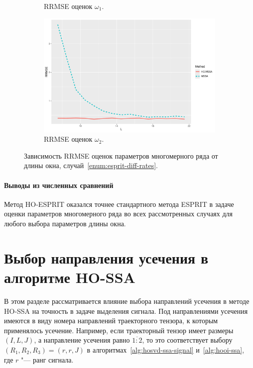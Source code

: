 \documentclass[specialist,
  substylefile=spbu_report.rtx,
subf,href,colorlinks=true, 12pt]{disser}
\theoremstyle{plain}
\theoremstyle{definition}
\theoremstyle{remark}
\begin{document}
\begin{figure}[!ht]
\begin{subfigure}{0.49\linewidth}
    \caption{RRMSE оценок $\omega_1$.}
    \label{fig:freq1_L}
  \end{subfigure}
  \begin{subfigure}{0.49\linewidth}
    \includegraphics[width=\linewidth, height=0.167\textheight]{freq2_L.pdf}
    \caption{RRMSE оценок $\omega_2$.}
    \label{fig:freq2_L}
  \end{subfigure}
  \caption{Зависимость RRMSE оценок параметров многомерного ряда от длины окна,
  случай~\ref{enum:esprit-diff-rates}.}
  \label{fig:L_diff_rates}
\end{figure}

\paragraph{Выводы из численных сравнений}
Метод HO-ESPRIT оказался точнее стандартного метода ESPRIT в задаче оценки параметров
многомерного ряда во всех рассмотренных случаях для любого выбора параметров
длины окна.

\FloatBarrier

\section{Выбор направления усечения в алгоритме HO-SSA}\label{sec:trunc-dim-ho-ssa}
В этом разделе рассматривается влияние выбора направлений усечения
в методе HO-SSA на точность в задаче выделения сигнала.
Под направлениями усечения имеются в виду номера направлений траекторного
тензора, к которым применялось усечение.
Например, если траекторный тензор имеет размеры $(I, L, J)$, а направление усечения
равно $\overline{1:2}$, то это соответствует выбору
$(R_1, R_2, R_3) = (r, r, J)$ в алгоритмах~\ref{alg:hosvd-ssa-signal}
и~\ref{alg:hooi-ssa}, где $r$ "--- ранг сигнала.
\end{document}
